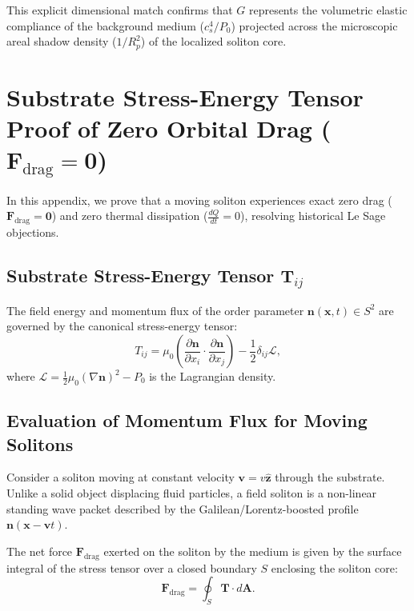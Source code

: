 \documentclass[11pt,a4paper]{article}
\begin{document}
	This explicit dimensional match confirms that $G$ represents the volumetric elastic compliance of the background medium ($c_s^4/P_0$) projected across the microscopic areal shadow density ($1/R_p^2$) of the localized soliton core.
	
	\section{Substrate Stress-Energy Tensor Proof of Zero Orbital Drag ($\mathbf{F}_{\text{drag}} = \mathbf{0}$)}
	\label{app:drag_cancellation_proof}
	
	In this appendix, we prove that a moving soliton experiences exact zero drag ($\mathbf{F}_{\text{drag}} = \mathbf{0}$) and zero thermal dissipation ($\frac{dQ}{dt} = 0$), resolving historical Le Sage objections.
	
	\subsection{Substrate Stress-Energy Tensor $\mathbf{T}_{ij}$}
	The field energy and momentum flux of the order parameter $\mathbf{n}(\mathbf{x}, t) \in S^2$ are governed by the canonical stress-energy tensor:
	\begin{equation}
		T_{ij} = \mu_0 \left( \frac{\partial \mathbf{n}}{\partial x_i} \cdot \frac{\partial \mathbf{n}}{\partial x_j} \right) - \frac{1}{2} \delta_{ij} \mathcal{L},
		\label{eq:stress_tensor_def}
	\end{equation}
	where $\mathcal{L} = \frac{1}{2} \mu_0 (\nabla \mathbf{n})^2 - P_0$ is the Lagrangian density.
	
	\subsection{Evaluation of Momentum Flux for Moving Solitons}
	Consider a soliton moving at constant velocity $\mathbf{v} = v \hat{\mathbf{z}}$ through the substrate. Unlike a solid object displacing fluid particles, a field soliton is a non-linear standing wave packet described by the Galilean/Lorentz-boosted profile $\mathbf{n}(\mathbf{x} - \mathbf{v}t)$.
	
	The net force $\mathbf{F}_{\text{drag}}$ exerted on the soliton by the medium is given by the surface integral of the stress tensor over a closed boundary $S$ enclosing the soliton core:
	\begin{equation}
		\mathbf{F}_{\text{drag}} = \oint_S \mathbf{T} \cdot d\mathbf{A}.
		\label{eq:drag_force_integral}
	\end{equation}
	
\end{document}
